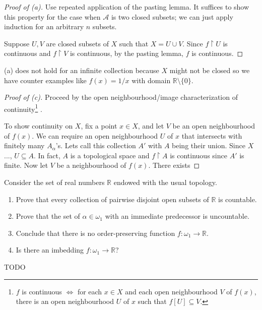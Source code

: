 \documentclass[../../main.tex]{subfiles}
\begin{document}
\begin{proof}[Proof of (a)]
	Use repeated application of the pasting lemma.
    It suffices to show this property for the case when $\mathscr{A}$ is two closed subsets; we can just apply induction for an arbitrary $n$ subsets.

    Suppose $U, V$ are closed subsets of $X$ such that $X = U \cup V$.
    Since $f \upharpoonright U$ is continuous and $f \upharpoonright V$ is continuous, by the pasting lemma, $f$ is continuous.
\end{proof}

(a) does not hold for an infinite collection because $X$ might not be closed so we have counter examples like $f(x) = 1/x$ with domain $\mathbb{R} \setminus \{0\}$.

\begin{proof}[Proof of (c)]
	Proceed by the open neighbourhood/image characterization of continuity\footnote{$f$ is continuous $\Leftrightarrow$ for each $x \in X$ and each open neighbourhood $V$ of $f(x)$, there is an open neighbourhood $U$ of $x$ such that $f[U] \subseteq V$.}
	.



	To show continuity on $X$, fix a point $x \in X$, and let $V$ be an open neighbourhood of $f(x)$.
	We can require an open neighbourhood $U$ of $x$ that intersects with finitely many $A_\alpha$'s.
    Lets call this collection $A'$ with $A$ being their union.
    Since $X$..., $U \subseteq A$.
    In fact, $A$ is a topological space and $f \upharpoonright A$ is continuous since $A'$ is finite.
    Now let $V$ be a neighbourhood of $f(x)$.
    There exists 
\end{proof}

\begin{problem}[5]
Consider the set of real numbers $\mathbb{R}$ endowed with the usual topology.
\begin{enumerate}[label=(\alph*)]
	\item Prove that every collection of pairwise disjoint open subsets of $\mathbb{R}$ is countable.
	\item Prove that the set of $\alpha\in\omega_1$ with an immediate predecessor is uncountable.
	\item Conclude that there is no order-preserving function $f\colon\omega_1\to\mathbb{R}$.
	\item Is there an imbedding $f\colon\omega_1\to\mathbb{R}$?
\end{enumerate}
\end{problem}
{\huge TODO}
\end{document}
